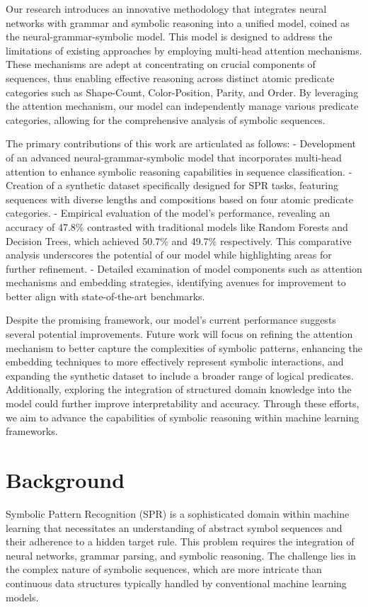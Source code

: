 \documentclass{article}
\begin{document}
Our research introduces an innovative methodology that integrates neural networks with grammar and symbolic reasoning into a unified model, coined as the neural-grammar-symbolic model. This model is designed to address the limitations of existing approaches by employing multi-head attention mechanisms. These mechanisms are adept at concentrating on crucial components of sequences, thus enabling effective reasoning across distinct atomic predicate categories such as Shape-Count, Color-Position, Parity, and Order. By leveraging the attention mechanism, our model can independently manage various predicate categories, allowing for the comprehensive analysis of symbolic sequences.

The primary contributions of this work are articulated as follows:
- Development of an advanced neural-grammar-symbolic model that incorporates multi-head attention to enhance symbolic reasoning capabilities in sequence classification.
- Creation of a synthetic dataset specifically designed for SPR tasks, featuring sequences with diverse lengths and compositions based on four atomic predicate categories.
- Empirical evaluation of the model's performance, revealing an accuracy of 47.8\% contrasted with traditional models like Random Forests and Decision Trees, which achieved 50.7\% and 49.7\% respectively. This comparative analysis underscores the potential of our model while highlighting areas for further refinement.
- Detailed examination of model components such as attention mechanisms and embedding strategies, identifying avenues for improvement to better align with state-of-the-art benchmarks.

Despite the promising framework, our model's current performance suggests several potential improvements. Future work will focus on refining the attention mechanism to better capture the complexities of symbolic patterns, enhancing the embedding techniques to more effectively represent symbolic interactions, and expanding the synthetic dataset to include a broader range of logical predicates. Additionally, exploring the integration of structured domain knowledge into the model could further improve interpretability and accuracy. Through these efforts, we aim to advance the capabilities of symbolic reasoning within machine learning frameworks.

\section{Background}
Symbolic Pattern Recognition (SPR) is a sophisticated domain within machine learning that necessitates an understanding of abstract symbol sequences and their adherence to a hidden target rule. This problem requires the integration of neural networks, grammar parsing, and symbolic reasoning. The challenge lies in the complex nature of symbolic sequences, which are more intricate than continuous data structures typically handled by conventional machine learning models.
\end{document}
